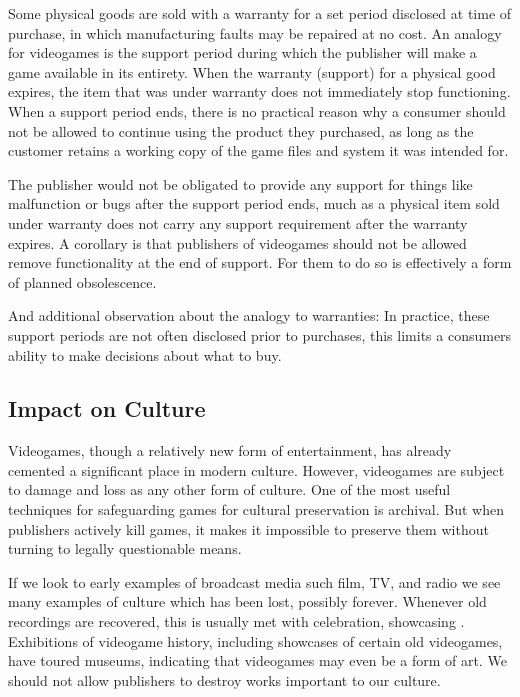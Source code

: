 Some physical goods are sold with a warranty for a set period disclosed at time of purchase, in which manufacturing faults may be repaired at no cost.
An analogy for videogames is the support period during which the publisher will make a game available in its entirety.
When the warranty (support) for a physical good expires, the item that was under warranty does not immediately stop functioning.
When a support period ends, there is no practical reason why a consumer should not be allowed to continue using the product they purchased,
as long as the customer retains a working copy of the game files and system it was intended for.

The publisher would not be obligated to provide any support for things like malfunction or bugs after the support period ends,
much as a physical item sold under warranty does not carry any support requirement after the warranty expires.
A corollary is that publishers of videogames should not be allowed remove functionality at the end of support.
For them to do so is effectively a form of planned obsolescence.

And additional observation about the analogy to warranties:
In practice, these support periods are not often disclosed prior to purchases\cn, this limits a consumers ability to make decisions about what to buy.

\subsection{Impact on Culture}
Videogames, though a relatively new form of entertainment, has already cemented a significant place in modern culture.
However, videogames are subject to damage and loss as any other form of culture.
One of the most useful techniques for safeguarding games for cultural preservation is archival.
But when publishers actively kill games, it makes it impossible to preserve them without turning to legally questionable means\cn.

If we look to early examples of broadcast media such film, TV, and radio we see many examples of culture which has been lost, possibly forever\cn.
Whenever old recordings are recovered, this is usually met with celebration, showcasing \cn.
Exhibitions of videogame history, including showcases of certain old videogames, have toured museums, indicating that videogames may even be a form of art.
We should not allow publishers to destroy works important to our culture.

